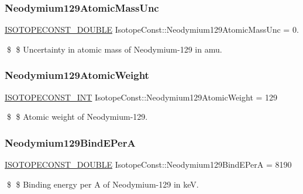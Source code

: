 \subsubsection{\texorpdfstring{Neodymium129\+Atomic\+Mass\+Unc}{Neodymium129AtomicMassUnc}}
{\footnotesize\ttfamily \mbox{\hyperlink{group___isotope_const-_macros_ga8f45a7272ce02c0b4c65c44636ed719a}{I\+S\+O\+T\+O\+P\+E\+C\+O\+N\+S\+T\+\_\+\+D\+O\+U\+B\+LE}} Isotope\+Const\+::\+Neodymium129\+Atomic\+Mass\+Unc = 0.}

\$ \$ Uncertainty in atomic mass of Neodymium-\/129 in amu. \mbox{\label{group___isotope_const-_neodymium-_nd129_gaa8209c4a48fc07248b04ff43231b58c2}} 
\subsubsection{\texorpdfstring{Neodymium129\+Atomic\+Weight}{Neodymium129AtomicWeight}}
{\footnotesize\ttfamily \mbox{\hyperlink{group___isotope_const-_macros_ga5f18360b3e99483a35c32d789e62621c}{I\+S\+O\+T\+O\+P\+E\+C\+O\+N\+S\+T\+\_\+\+I\+NT}} Isotope\+Const\+::\+Neodymium129\+Atomic\+Weight = 129}

\$ \$ Atomic weight of Neodymium-\/129. \mbox{\label{group___isotope_const-_neodymium-_nd129_gacbb8d4e68b9391445783e40e03dc6b75}} 
\subsubsection{\texorpdfstring{Neodymium129\+Bind\+E\+PerA}{Neodymium129BindEPerA}}
{\footnotesize\ttfamily \mbox{\hyperlink{group___isotope_const-_macros_ga8f45a7272ce02c0b4c65c44636ed719a}{I\+S\+O\+T\+O\+P\+E\+C\+O\+N\+S\+T\+\_\+\+D\+O\+U\+B\+LE}} Isotope\+Const\+::\+Neodymium129\+Bind\+E\+PerA = 8190}

\$ \$ Binding energy per A of Neodymium-\/129 in keV. \mbox{\label{group___isotope_const-_neodymium-_nd129_ga875c6a6b3861ee80a358e92c3b99d47c}} 
